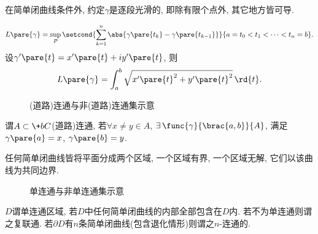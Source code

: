 \documentclass[../ComplexVariable.tex]{subfiles}
\begin{document}
\begin{remark}
    在简单闭曲线条件外, 约定$\gamma$是逐段光滑的, 即除有限个点外, 其它地方皆可导.
\end{remark}
\begin{definition}[曲线的长度]
    \[ L\pare{\gamma} = \sup_P \setcond{\sum_{k=1}^n \abs{\gamma\pare{t_k} - \gamma\pare{t_{k-1}}}}{a=t_0 < t_1 < \cdots < t_n = b}. \]
    设$\gamma'\pare{t} = x'\pare{t} + iy'\pare{t}$, 则
    \[ L\pare{\gamma} = \int_a^b \sqrt{x'\pare{t}^2 + y'\pare{t}^2} \,\rd{t}. \]
\end{definition}
\begin{figure}[ht]
    \centering
    \caption{(道路)连通与非(道路)连通集示意}
\end{figure}
\begin{definition}[连通]
    谓$A\subset \+bC$(道路)连通, 若$\forall x\neq y\in A$, $\exists\, \func{\gamma}{\brac{a,b}}{A}$, 满足$\gamma\pare{a} = x$, $\gamma\pare{b} = y$.
\end{definition}
\begin{theorem}[Jordan曲线定理]
    任何简单闭曲线皆将平面分成两个区域, 一个区域有界, 一个区域无解, 它们以该曲线为共同边界.
\end{theorem}
\begin{figure}[ht]
    \centering
    \caption{单连通与非单连通集示意}
\end{figure}
\begin{definition}[单连通]
    $D$谓单连通区域, 若$D$中任何简单闭曲线的内部全部包含在$D$内. 若不为单连通则谓之复联通. 若$\partial D$有$n$条简单闭曲线(包含退化情形)则谓之$n$-连通的.
\end{definition}



\end{document}

